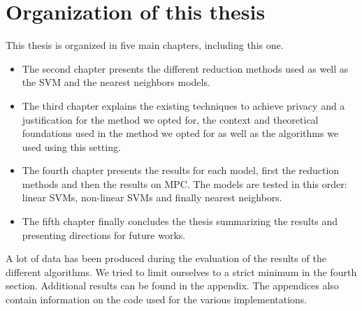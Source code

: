 \section{Organization of this thesis}
This thesis is organized in five main chapters, including this one. 

\begin{itemize}
	\item The second chapter presents the different reduction methods used as well as the SVM and the nearest neighbors models.
	\item The third chapter explains the existing techniques to achieve privacy and a justification for the method we opted for, the context and theoretical foundations used in the method we opted for as well as the algorithms we used using this setting.
	\item The fourth chapter presents the results for each model, first the reduction methods and then the results on MPC. The models are tested in this order: linear SVMs, non-linear SVMs and finally nearest neighbors.
	\item The fifth chapter finally concludes the thesis summarizing the results and presenting directions for future works.
\end{itemize}

A lot of data has been produced during the evaluation of the results of the different algorithms. We tried to limit ourselves to a strict minimum in the fourth section. Additional results can be found in the appendix. The appendices also contain information on the code used for the various implementations.